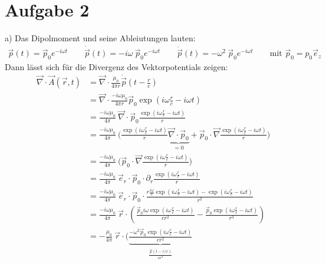 \documentclass[11pt a4paper]{article}
\newcommand{\del}{\partial}
\newcommand{\diver}{\vec \nabla \cdot}
\begin{document}
\section*{Aufgabe 2}
a) Das Dipolmoment und seine Ableiutungen lauten:
\begin{align*}
	\vec p(t) 
	= \vec p_0 e^{-i\omega t}
	\qquad
	\dot{\vec p}(t) 
	= -i\omega \ \vec p_0 e^{-i\omega t}
	\qquad
	\ddot{\vec p}(t) 
	= -\omega^2 \ \vec p_0 e^{-i\omega t}
	\qquad \text{mit }
	\vec p_0 = p_0 \vec e_z
\end{align*}
Dann lässt sich für die Divergenz des Vektorpotentials zeigen:
\begin{align*}
	\diver \vec A(\vec r, t)
	&= \diver \frac{\mu_0}{4\pi r} \dot{\vec p} \left(t - \frac rc\right) \\
	&= \diver \frac{-i \omega \mu_0}{4\pi r} \vec p_0 \exp \left( i\omega \frac rc - i\omega t \right) \\
	&= 
		\frac{-i \omega \mu_0}{4\pi}  \
		\diver \vec p_0 \frac{\exp\left(i\omega\frac rc - i\omega t\right)}{r} \\
	&= 
		\frac{-i \omega \mu_0}{4\pi}  \
		\Bigg (
			\frac{\exp\left(i\omega\frac rc - i\omega t\right)}{r}  
			\underbrace{\diver \vec p_0}_{=0}
			+ \vec p_0 \cdot \vec \nabla \frac{\exp\left(i\omega\frac rc - i\omega t\right)}{r}
		\Bigg ) \\
	&= 
		\frac{-i \omega \mu_0}{4\pi}  \
		\Bigg (
			\vec p_0 \cdot \vec \nabla \frac{\exp\left(i\omega\frac rc - i\omega t\right)}{r}
		\Bigg ) \\
	&= 
		\frac{-i \omega \mu_0}{4\pi}  \ \vec e_r \cdot \vec p_0 \cdot
		 \del_r \frac{\exp\left(i\omega\frac rc - i\omega t\right)}{r} \\
	&= 
		\frac{-i \omega \mu_0}{4\pi}  \ \vec e_r \cdot \vec p_0 \cdot
		 \frac{r 
		 	\frac{i\omega}{c} \exp\left(i\omega\frac rc - i\omega t\right)
		 	- \exp\left(i\omega\frac rc - i\omega t\right)}{r^2} \\
	&= 
		\frac{-i \omega \mu_0}{4\pi}  \ \vec r \cdot 
		\left(
		 \frac{\vec p_0 i\omega \exp\left(i\omega\frac rc - i\omega t\right)}{c r^2}
		 - \frac{\vec p_0 \exp\left(i\omega\frac rc - i\omega t\right)}{r^3}
		\right) \\
	&= 
		- \frac{\mu_0}{4\pi}  \ \vec r \cdot 
		\Bigg(
		 \underbrace{\frac{-\omega^2 \vec p_0 \exp\left(i\omega\frac rc - i\omega t\right)}{c r^2}}
		 _{\frac{\ddot{\vec p}(t - r/c)}{cr^2}}

\end{align*}
\end{document}
